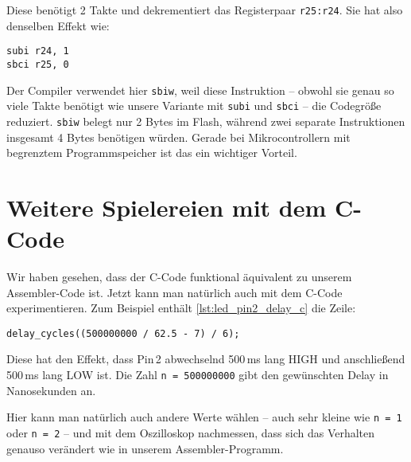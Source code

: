 \documentclass[a4paper,12pt]{article}
\begin{document}
\begin{enumerate}
\noindent
Diese benötigt 2 Takte und dekrementiert das Registerpaar \texttt{r25:r24}.
Sie hat also denselben Effekt wie:
\begin{lstlisting}[language={[x86masm]Assembler}]
subi r24, 1
sbci r25, 0
\end{lstlisting}
Der Compiler verwendet hier \texttt{sbiw}, weil diese Instruktion – obwohl sie
genau so viele Takte benötigt wie unsere Variante mit \texttt{subi} und
\texttt{sbci} – die Codegröße reduziert. \texttt{sbiw} belegt nur 2 Bytes im
Flash, während zwei separate Instruktionen insgesamt 4 Bytes benötigen würden.
Gerade bei Mikrocontrollern mit begrenztem Programmspeicher ist das ein
wichtiger Vorteil.
\end{enumerate}


\section{Weitere Spielereien mit dem C-Code}

Wir haben gesehen, dass der C-Code funktional äquivalent zu unserem
Assembler-Code ist. Jetzt kann man natürlich auch mit dem C-Code experimentieren.
Zum Beispiel enthält \autoref{lst:led_pin2_delay_c} die Zeile:

\begin{lstlisting}
delay_cycles((500000000 / 62.5 - 7) / 6);
\end{lstlisting}

Diese hat den Effekt, dass Pin 2 abwechselnd 500\,ms lang HIGH und anschließend
500\,ms lang LOW ist. Die Zahl \texttt{n = 500000000} gibt den gewünschten
Delay in Nanosekunden an.

Hier kann man natürlich auch andere Werte wählen – auch sehr kleine wie
\texttt{n = 1} oder \texttt{n = 2} – und mit dem Oszilloskop nachmessen, dass
sich das Verhalten genauso verändert wie in unserem Assembler-Programm.
\end{document}

